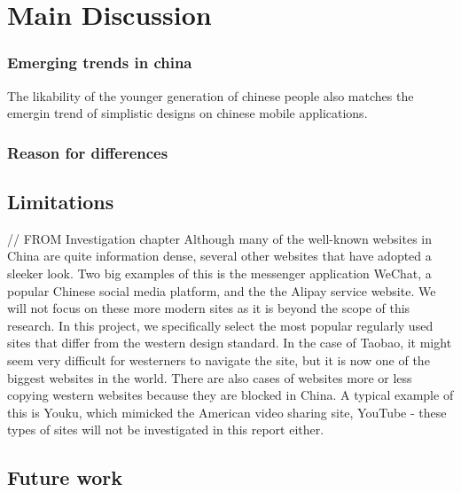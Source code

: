 
\chapter{Main Discussion} %

\label{Chapter9} %



 \subsection{Emerging trends in china}
 The likability of the younger generation of chinese people also matches the emergin trend of simplistic designs on chinese mobile applications.
 \subsection{Reason for differences}
 \section{Limitations}
// FROM Investigation chapter
Although many of the well-known websites in China are quite information dense, several other websites that have adopted a sleeker look. Two big examples of this is the messenger application WeChat, a popular Chinese social media platform, and the the Alipay service website. We will not focus on these more modern sites as it is beyond the scope of this research. In this project, we specifically select the most popular regularly used sites that differ from the western design standard. In the case of Taobao, it might seem very difficult for westerners to navigate the site, but it is now one of the biggest websites in the world. There are also cases of websites more or less copying western websites because they are blocked in China. A typical example of this is Youku, which mimicked the American video sharing site, YouTube - these types of sites will not be investigated in this report either.
\section{Future work}



